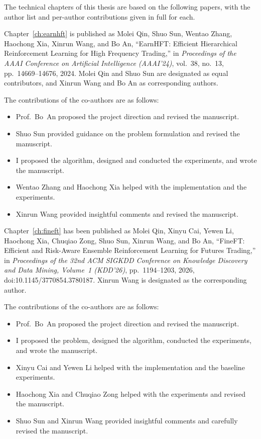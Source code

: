 \documentclass[12pt,a4paper]{Thesis} %
\begin{document}
{The technical chapters of this thesis are based on the following papers, with the author list and per-author contributions given in full for each.

	Chapter~\ref{ch:earnhft} is published as Molei Qin, Shuo Sun, Wentao Zhang, Haochong Xia, Xinrun Wang, and Bo An, ``EarnHFT: Efficient Hierarchical Reinforcement Learning for High Frequency Trading,'' in \emph{Proceedings of the AAAI Conference on Artificial Intelligence (AAAI'24)}, vol.~38, no.~13, pp.~14669--14676, 2024. Molei Qin and Shuo Sun are designated as equal contributors, and Xinrun Wang and Bo An as corresponding authors.

	The contributions of the co-authors are as follows:
	\begin{itemize}[topsep=1pt,itemsep=1pt,partopsep=1pt, parsep=1pt]
		\item Prof.\ Bo~An proposed the project direction and revised the manuscript.
		\item Shuo Sun provided guidance on the problem formulation and revised the manuscript.
		\item I proposed the algorithm, designed and conducted the experiments, and wrote the manuscript.
		\item Wentao Zhang and Haochong Xia helped with the implementation and the experiments.
		\item Xinrun Wang provided insightful comments and revised the manuscript.
	\end{itemize}

	Chapter~\ref{ch:fineft} has been published as Molei Qin, Xinyu Cai, Yewen Li, Haochong Xia, Chuqiao Zong, Shuo Sun, Xinrun Wang, and Bo An, ``FineFT: Efficient and Risk-Aware Ensemble Reinforcement Learning for Futures Trading,'' in \emph{Proceedings of the 32nd ACM SIGKDD Conference on Knowledge Discovery and Data Mining, Volume~1 (KDD'26)}, pp.~1194--1203, 2026, doi:10.1145/3770854.3780187. Xinrun Wang is designated as the corresponding author.

	The contributions of the co-authors are as follows:
	\begin{itemize}[topsep=1pt,itemsep=1pt,partopsep=1pt, parsep=1pt]
		\item Prof.\ Bo~An proposed the project direction and revised the manuscript.
		\item I proposed the problem, designed the algorithm, conducted the experiments, and wrote the manuscript.
		\item Xinyu Cai and Yewen Li helped with the implementation and the baseline experiments.
		\item Haochong Xia and Chuqiao Zong helped with the experiments and revised the manuscript.
		\item Shuo Sun and Xinrun Wang provided insightful comments and carefully revised the manuscript.
	\end{itemize}

}
\end{document}
